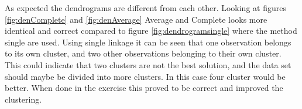 
As expected the dendrograms are different from each other.
Looking at figures \ref{fig:denComplete} and \ref{fig:denAverage} Average and Complete looks more identical and correct compared to figure \ref{fig:dendrogramsingle} where the method single are used. Using single linkage it can be seen that one observation belongs to its own cluster, and two other observations belonging to their own cluster.
This could indicate that two clusters are not the best solution, and the data set should maybe be divided into more clusters. In this case four cluster would be better. When done in the exercise this proved to be correct and improved the clustering. 
